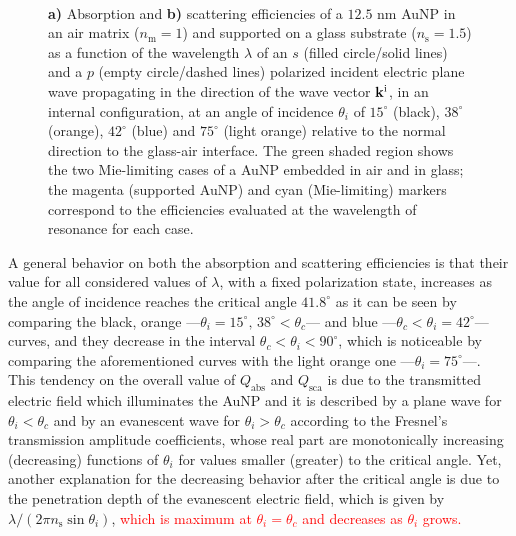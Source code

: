 \begin{figure}[h!]
    \def\svgwidth{.95\textwidth}
    \centering
    \hspace*{-28.5em}%
    \vspace*{-1.25em}%
        \begin{subfigure}{.71\textwidth}\caption{ }\label{sfig:SuppObl:Eff:Abs}\end{subfigure}%
        \begin{subfigure}{.25\textwidth}\caption{ }\label{sfig:SuppObl:Eff:Sca}\end{subfigure} \\
    \vspace*{-.5em}
    \caption[Absorption and Scattering Efficiencies of a 12.5 nm AuNP on a Interface Illuminated in an internal configuration at oblique incidence]{\textbf{a)} Absorption and \textbf{b)} scattering efficiencies of a $12.5$ nm AuNP in an air matrix ($n_\text{m} = 1$) and supported on a glass substrate ($n_\text{s} = 1.5$) as a function of the wavelength $\lambda$ of an  $s$ (filled circle/solid lines) and a $p$ (empty circle/dashed lines) polarized incident electric plane wave propagating in the direction of the wave vector $\vb{k}^\text{i}$, in an internal configuration, at an angle of incidence $\theta_i$ of $15^\circ$ (black),  $38^\circ$ (orange),  $42^\circ$ (blue) and  $75^\circ$ (light orange) relative to the normal direction to the glass-air interface. The green shaded region shows the two Mie-limiting cases of a AuNP embedded in air and in glass; the magenta (supported AuNP) and cyan (Mie-limiting) markers correspond to the efficiencies evaluated at the wavelength of resonance for each case.}
\label{fig:SuppObl:Eff}
\end{figure}

A general behavior on both the absorption and scattering efficiencies is that their value for all considered values of $\lambda$, with a fixed polarization state, increases as the angle of incidence reaches the critical angle $41.8^\circ$ as it can be seen by comparing the black, orange ---$\theta_i = 15^\circ,\, 38^\circ < \theta_c$---  and blue ---$\theta_c<\theta_i = 42^\circ$--- curves, and they decrease in the interval  $\theta_c<\theta_i<90^\circ$, which is noticeable by comparing the aforementioned curves with the light orange one ---$\theta_i = 75^\circ$---. This tendency on the overall value of $Q_\text{abs}$ and $Q_\text{sca}$ is due to the transmitted electric field which illuminates the AuNP and it is described by a plane wave for $\theta_i<\theta_c$ and by an evanescent wave for $\theta_i>\theta_c$ according to the Fresnel's transmission amplitude coefficients, whose real part are monotonically increasing (decreasing) functions of $\theta_i$ for values smaller (greater) to the critical angle. Yet, another explanation for the decreasing behavior after the critical angle is due to the penetration depth of the evanescent electric field, which is given by $\lambda/(2\pi n_\text{s}\sin\theta_i)$, \textcolor{red}{which is maximum at $\theta_i =\theta_c$ and decreases as $\theta_i$ grows.}

